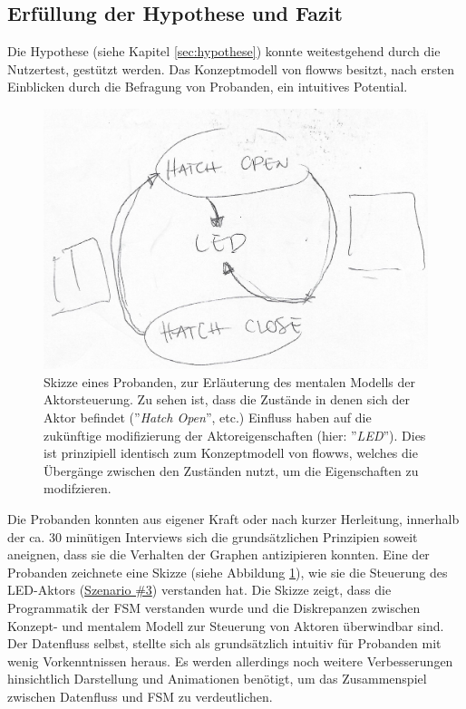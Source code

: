 \subsection{Erfüllung der Hypothese und Fazit}
Die Hypothese (siehe Kapitel \ref{sec:hypothese}) konnte weitestgehend durch die Nutzertest, gestützt werden. Das Konzeptmodell von flowws besitzt, nach ersten Einblicken durch die Befragung von Probanden, ein intuitives Potential.

\begin{figure}[h]
    \centering
    \includegraphics[width=.7\textwidth]{bilder/chapter5/joanna.jpg}
    \caption{Skizze eines Probanden, zur Erläuterung des mentalen Modells der Aktorsteuerung. Zu sehen ist, dass die Zustände in denen sich der Aktor befindet (''\textit{Hatch Open}'', etc.) Einfluss haben auf die zukünftige modifizierung der Aktoreigenschaften (hier: ''\textit{LED}'').  Dies ist prinzipiell identisch zum Konzeptmodell von flowws, welches die Übergänge zwischen den Zuständen nutzt, um die Eigenschaften zu modifzieren.}
    \label{fig:enduserskizze}
\end{figure}

Die Probanden konnten aus eigener Kraft oder nach kurzer Herleitung, innerhalb der ca. 30 minütigen Interviews sich die grundsätzlichen Prinzipien soweit aneignen, dass sie die Verhalten der Graphen antizipieren konnten. Eine der Probanden zeichnete eine Skizze (siehe Abbildung \ref{fig:enduserskizze}), wie sie die Steuerung des LED-Aktors (\hyperref[szenario2]{Szenario \#3}) verstanden hat. Die Skizze zeigt, dass die Programmatik der \ac{FSM} verstanden wurde und die Diskrepanzen zwischen Konzept- und mentalem Modell zur Steuerung von Aktoren überwindbar sind. Der Datenfluss selbst, stellte sich als grundsätzlich intuitiv für Probanden mit wenig Vorkenntnissen heraus. Es werden allerdings noch weitere Verbesserungen hinsichtlich Darstellung und Animationen benötigt, um das Zusammenspiel zwischen Datenfluss und \ac{FSM} zu verdeutlichen.

